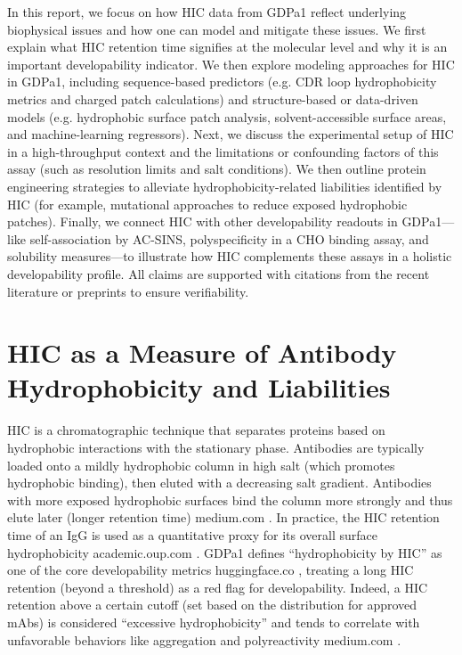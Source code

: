 \documentclass[12pt]{article}
\begin{document}
In this report, we focus on how HIC data from GDPa1 reflect underlying biophysical issues and how one can model and mitigate these issues. We first explain what HIC retention time signifies at the molecular level and why it is an important developability indicator. We then explore modeling approaches for HIC in GDPa1, including sequence-based predictors (e.g. CDR loop hydrophobicity metrics and charged patch calculations) and structure-based or data-driven models (e.g. hydrophobic surface patch analysis, solvent-accessible surface areas, and machine-learning regressors). Next, we discuss the experimental setup of HIC in a high-throughput context and the limitations or confounding factors of this assay (such as resolution limits and salt conditions). We then outline protein engineering strategies to alleviate hydrophobicity-related liabilities identified by HIC (for example, mutational approaches to reduce exposed hydrophobic patches). Finally, we connect HIC with other developability readouts in GDPa1—like self-association by AC-SINS, polyspecificity in a CHO binding assay, and solubility measures—to illustrate how HIC complements these assays in a holistic developability profile. All claims are supported with citations from the recent literature or preprints to ensure verifiability.

\section{HIC as a Measure of Antibody Hydrophobicity and Liabilities}
HIC is a chromatographic technique that separates proteins based on hydrophobic interactions with the stationary phase. Antibodies are typically loaded onto a mildly hydrophobic column in high salt (which promotes hydrophobic binding), then eluted with a decreasing salt gradient. Antibodies with more exposed hydrophobic surfaces bind the column more strongly and thus elute later (longer retention time)
medium.com
. In practice, the HIC retention time of an IgG is used as a quantitative proxy for its overall surface hydrophobicity
academic.oup.com
. GDPa1 defines “hydrophobicity by HIC” as one of the core developability metrics
huggingface.co
, treating a long HIC retention (beyond a threshold) as a red flag for developability. Indeed, a HIC retention above a certain cutoff (set based on the distribution for approved mAbs) is considered “excessive hydrophobicity” and tends to correlate with unfavorable behaviors like aggregation and polyreactivity
medium.com
.
\end{document}

